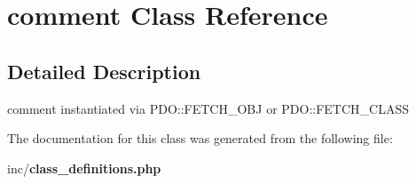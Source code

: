 \section{comment Class Reference}
\label{classcomment}


\subsection{Detailed Description}
comment instantiated via P\+D\+O\+::\+F\+E\+T\+C\+H\+\_\+\+O\+BJ or P\+D\+O\+::\+F\+E\+T\+C\+H\+\_\+\+C\+L\+A\+SS 

The documentation for this class was generated from the following file\+:\begin{DoxyCompactItemize}
\item 
inc/{\bf class\+\_\+definitions.\+php}\end{DoxyCompactItemize}
